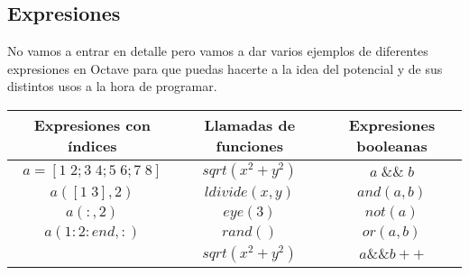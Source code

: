 \subsection{Expresiones}
No vamos a entrar en detalle pero vamos a dar varios ejemplos de diferentes expresiones en Octave para que puedas hacerte a la idea del potencial y de sus distintos usos a la hora de programar. 
\begin{octavebox}
\begin{center}
\begin{tabular}{ccc}
Expresiones con índices &  Llamadas de funciones & Expresiones booleanas\\ \hline
$a=[1 \; 2;3 \; 4;5 \;6;7 \;8]$ & $sqrt(x^2+y^2)$ & $a \; \& \& \; b$ \\
$a([1 \; 3],2)$ & $ldivide(x,y)$ & $and(a,b)$ \\
$a(:,2)$ & $eye(3)$ & $not(a)$ \\
$a(1:2:end,:)$ & $rand()$ & $or(a,b)$ \\
 & $sqrt(x^2+y^2)$ & $a \& \& b++$ \\
\end{tabular}
\end{center}
\end{octavebox}


